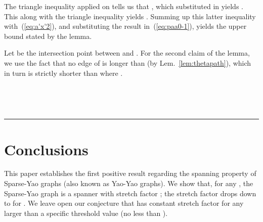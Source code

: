 \documentclass[11pt]{article}
\newcommand{\qed}{\rule{0.5em}{1.5ex}}
\newcommand{\fqed}{{\hfill~\qed}}
\newcommand{\eproof}{{\hfill~\fqed} \vspace{1em}}
\begin{document}
The triangle inequality applied on  tells us that , which substituted in  yields . This along with the triangle inequality  yields . Summing up this latter inequality with~(\ref{eq:a'x'2}), and substituting the result in~(\ref{eq:paa0-1}), yields the upper bound stated by the lemma.

Let  be the intersection point between  and . For the second claim of the lemma, we use the fact that no edge of  is longer than  (by Lem.~\ref{lem:thetapath}), which in turn is strictly shorter than  where .
\eproof

\section{Conclusions}
\label{sec:conclusions}
This paper establishes the first positive result regarding the spanning property of Sparse-Yao graphs (also known as Yao-Yao graphs). We show that, for any , the Sparse-Yao graph  is a spanner with stretch factor ; the stretch factor drops down to  for . We leave open our conjecture that  has constant stretch factor for any  larger than a specific threshold value (no less than ).

\medskip
\end{document}
